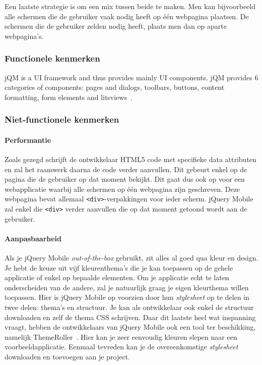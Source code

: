 \documentclass[a4paper]{article}
\newcommand{\term}[1]{\emph{#1}}
\newcommand{\code}[1]{\texttt{#1}}
\begin{document}
Een laatste strategie is om een mix tussen beide te maken. Men kan bijvoorbeeld alle schermen die de gebruiker vaak nodig heeft op één webpagina plaatsen. De schermen die de gebruiker zelden nodig heeft, plaats men dan op aparte webpagina's.  

\subsubsection{Functionele kenmerken}
jQM is a UI framework and thus provides mainly UI components. jQM provides 6 categories of components: pages and dialogs, toolbars, buttons, content formatting, form elements and litsviews~\cite{JQuery2012b}.

\subsubsection{Niet-functionele kenmerken}
\paragraph{Performantie}
Zoals gezegd schrijft de ontwikkelaar HTML5 code met specifieke data attributen en zal het raamwerk daarna de code verder aanvullen. Dit gebeurt enkel op de pagina die de gebruiker op dat moment bekijkt. Dit gaat dus ook op voor een webapplicatie waarbij alle schermen op één webpagina zijn geschreven. Deze webpagina bevat allemaal \code{<div>}-verpakkingen voor ieder scherm. jQuery Mobile zal enkel die \code{<div>} verder aanvullen die op dat moment getoond wordt aan de gebruiker. 

\paragraph{Aanpasbaarheid}
Als je jQuery Mobile \term{out-of-the-box} gebruikt, zit alles al goed qua kleur en design. Je hebt de keuze uit vijf kleurenthema's die je kan toepassen op de gehele applicatie of enkel op bepaalde elementen. Om je applicatie echt te laten onderscheiden van de andere, zal je natuurlijk graag je eigen kleurthema willen toepassen. Hier is jQuery Mobile op voorzien door hun \term{stylesheet} op te delen in twee delen: thema's en structuur. Je kan als ontwikkelaar ook enkel de structuur downloaden en zelf de thema CSS schrijven. Daar dit laatste heel wat inspanning vraagt, hebben de ontwikkelaars van jQuery Mobile ook een tool ter beschikking,  namelijk ThemeRoller~\cite{JQuery2012c}. Hier kan je zeer eenvoudig kleuren slepen naar een voorbeeldapplicatie. Eenmaal tevreden kan je de overeenkomstige \term{stylesheet} downloaden en toevoegen aan je project.
\end{document}
